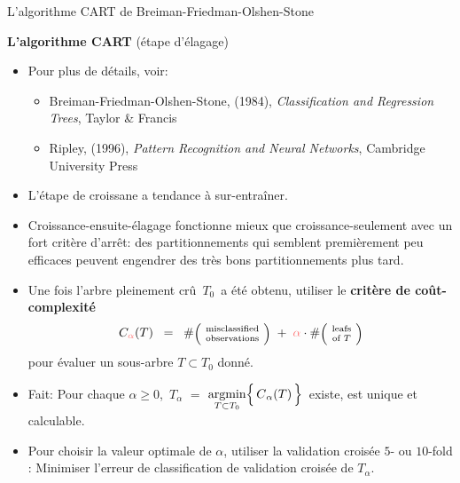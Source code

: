 
\begin{frame}{\vskip -0.2cm \large L'algorithme CART de Breiman-Friedman-Olshen-Stone}

\Large
\textbf{L'algorithme CART } {(\'etape d'\'elagage)}

\vskip 0.1cm
\scriptsize
\begin{itemize}
\pause
\item
	Pour plus de d\'etails, voir:
	\vskip -0.2cm
	{\tiny\begin{itemize}
	\item
		{\tiny Breiman-Friedman-Olshen-Stone, (1984),
		\textit{Classification and Regression Trees}, Taylor \& Francis}
	\item
		\vskip -0.1cm
		{\tiny Ripley, (1996),
		\textit{Pattern Recognition and Neural Networks}, Cambridge University Press}
	\end{itemize}}
\pause
\item
	L'\'etape de croissane a tendance \`a sur-entra\^iner.
\pause
\item
	Croissance-ensuite-\'elagage fonctionne mieux que croissance-seulement avec un fort crit\`ere d'arr\^et:
	des partitionnements qui semblent premi\`erement peu efficaces peuvent engendrer des tr\`es bons
	partitionnements plus tard.
\pause
\item
	{\color{mediumGray}Une fois l'arbre pleinement cr\^u \,$T_{0}$\, a \'et\'e obtenu, utiliser le \textbf{crit\`ere de co\^ut-complexit\'e}
	\vskip -0.1cm
	\begin{equation*}
	C_{{\color{lightRed}\alpha}}(T) \;\; = \;\;
		\#\textnormal{\scriptsize$\left(\!\begin{array}{c}
			\textnormal{misclassified}
			\\
			\textnormal{observations}
		\end{array}\!\right)$}
		\; + \;
		{\color{lightRed}\alpha} \cdot
		\#\textnormal{\scriptsize$\left(\!\begin{array}{c}
			\textnormal{leafs}
			\\
			\textnormal{of $T$}
		\end{array}\!\right)$}
	\end{equation*}
	\vskip -0.1cm
	pour \'evaluer un sous-arbre $T \subset T_{0}$ donn\'e.}
\item
	{\color{mediumGray}Fait:
	{\color{lightRed}Pour chaque $\alpha \geq 0$,
	\,$T_{\alpha}$ $=$
	$\underset{T \subset T_{0}}{\textnormal{argmin}}\!\left\{\,\overset{{\color{white}.}}{C}_{\alpha}(T)\,\right\}$\,
	existe, est unique et calculable.}}
\item
	{\color{mediumGray}Pour choisir la valeur optimale de $\alpha$, utiliser la validation crois\'ee $5$- ou $10$-fold :
	Minimiser l'erreur de classification de validation crois\'ee de $T_{\alpha}$.}
\end{itemize}

\end{frame}
\normalsize

